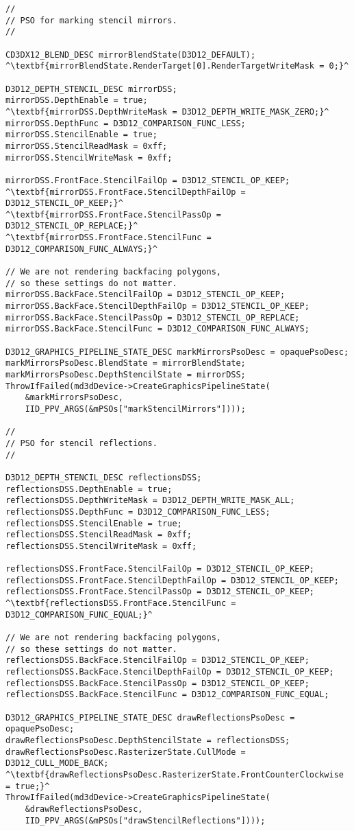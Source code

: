 \begin{lstlisting}[escapechar=^]
//
// PSO for marking stencil mirrors.
//

CD3DX12_BLEND_DESC mirrorBlendState(D3D12_DEFAULT);
^\textbf{mirrorBlendState.RenderTarget[0].RenderTargetWriteMask = 0;}^

D3D12_DEPTH_STENCIL_DESC mirrorDSS;
mirrorDSS.DepthEnable = true;
^\textbf{mirrorDSS.DepthWriteMask = D3D12_DEPTH_WRITE_MASK_ZERO;}^
mirrorDSS.DepthFunc = D3D12_COMPARISON_FUNC_LESS;
mirrorDSS.StencilEnable = true;
mirrorDSS.StencilReadMask = 0xff;
mirrorDSS.StencilWriteMask = 0xff;

mirrorDSS.FrontFace.StencilFailOp = D3D12_STENCIL_OP_KEEP;
^\textbf{mirrorDSS.FrontFace.StencilDepthFailOp = D3D12_STENCIL_OP_KEEP;}^
^\textbf{mirrorDSS.FrontFace.StencilPassOp = D3D12_STENCIL_OP_REPLACE;}^
^\textbf{mirrorDSS.FrontFace.StencilFunc = D3D12_COMPARISON_FUNC_ALWAYS;}^

// We are not rendering backfacing polygons, 
// so these settings do not matter.
mirrorDSS.BackFace.StencilFailOp = D3D12_STENCIL_OP_KEEP;
mirrorDSS.BackFace.StencilDepthFailOp = D3D12_STENCIL_OP_KEEP;
mirrorDSS.BackFace.StencilPassOp = D3D12_STENCIL_OP_REPLACE;
mirrorDSS.BackFace.StencilFunc = D3D12_COMPARISON_FUNC_ALWAYS;

D3D12_GRAPHICS_PIPELINE_STATE_DESC markMirrorsPsoDesc = opaquePsoDesc;
markMirrorsPsoDesc.BlendState = mirrorBlendState;
markMirrorsPsoDesc.DepthStencilState = mirrorDSS;
ThrowIfFailed(md3dDevice->CreateGraphicsPipelineState(
    &markMirrorsPsoDesc, 
    IID_PPV_ARGS(&mPSOs["markStencilMirrors"])));

//
// PSO for stencil reflections.
//

D3D12_DEPTH_STENCIL_DESC reflectionsDSS;
reflectionsDSS.DepthEnable = true;
reflectionsDSS.DepthWriteMask = D3D12_DEPTH_WRITE_MASK_ALL;
reflectionsDSS.DepthFunc = D3D12_COMPARISON_FUNC_LESS;
reflectionsDSS.StencilEnable = true;
reflectionsDSS.StencilReadMask = 0xff;
reflectionsDSS.StencilWriteMask = 0xff;

reflectionsDSS.FrontFace.StencilFailOp = D3D12_STENCIL_OP_KEEP;
reflectionsDSS.FrontFace.StencilDepthFailOp = D3D12_STENCIL_OP_KEEP;
reflectionsDSS.FrontFace.StencilPassOp = D3D12_STENCIL_OP_KEEP;
^\textbf{reflectionsDSS.FrontFace.StencilFunc = D3D12_COMPARISON_FUNC_EQUAL;}^

// We are not rendering backfacing polygons, 
// so these settings do not matter.
reflectionsDSS.BackFace.StencilFailOp = D3D12_STENCIL_OP_KEEP;
reflectionsDSS.BackFace.StencilDepthFailOp = D3D12_STENCIL_OP_KEEP;
reflectionsDSS.BackFace.StencilPassOp = D3D12_STENCIL_OP_KEEP;
reflectionsDSS.BackFace.StencilFunc = D3D12_COMPARISON_FUNC_EQUAL;

D3D12_GRAPHICS_PIPELINE_STATE_DESC drawReflectionsPsoDesc = opaquePsoDesc;
drawReflectionsPsoDesc.DepthStencilState = reflectionsDSS;
drawReflectionsPsoDesc.RasterizerState.CullMode = D3D12_CULL_MODE_BACK;
^\textbf{drawReflectionsPsoDesc.RasterizerState.FrontCounterClockwise = true;}^
ThrowIfFailed(md3dDevice->CreateGraphicsPipelineState(
    &drawReflectionsPsoDesc, 
    IID_PPV_ARGS(&mPSOs["drawStencilReflections"])));
\end{lstlisting}

